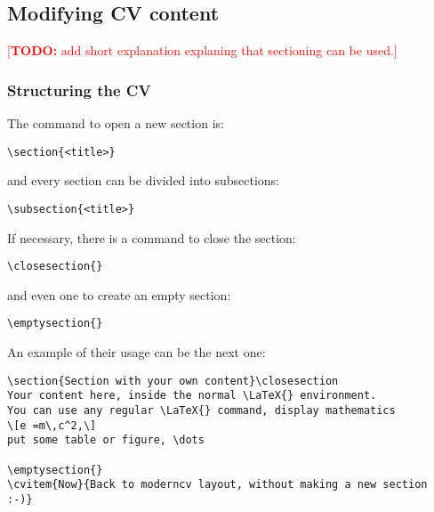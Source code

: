 \documentclass[a4paper,11pt]{article}
\newcommand{\todox}[1]{\textcolor{red}{[\textbf{TODO:} #1]}}
\begin{document}
\subsection{Modifying CV content}
\todox{add short explanation explaning that sectioning can be used.}
\subsubsection{Structuring the CV}

The command to open a new section is: 

\begin{verbatim}
\section{<title>}
\end{verbatim}

and every section can be divided into subsections:

\begin{verbatim}
\subsection{<title>}
\end{verbatim}

If necessary, there is a command to close the section: 

\begin{verbatim}
\closesection{}
\end{verbatim}

and even one to create an empty section:

\begin{verbatim}
\emptysection{}
\end{verbatim}

An example of their usage can be the next one:

\begin{verbatim}
\section{Section with your own content}\closesection
Your content here, inside the normal \LaTeX{} environment. 
You can use any regular \LaTeX{} command, display mathematics
\[e =m\,c^2,\]
put some table or figure, \dots

\emptysection{}
\cvitem{Now}{Back to moderncv layout, without making a new section :-)}
\end{verbatim}
\end{document}
